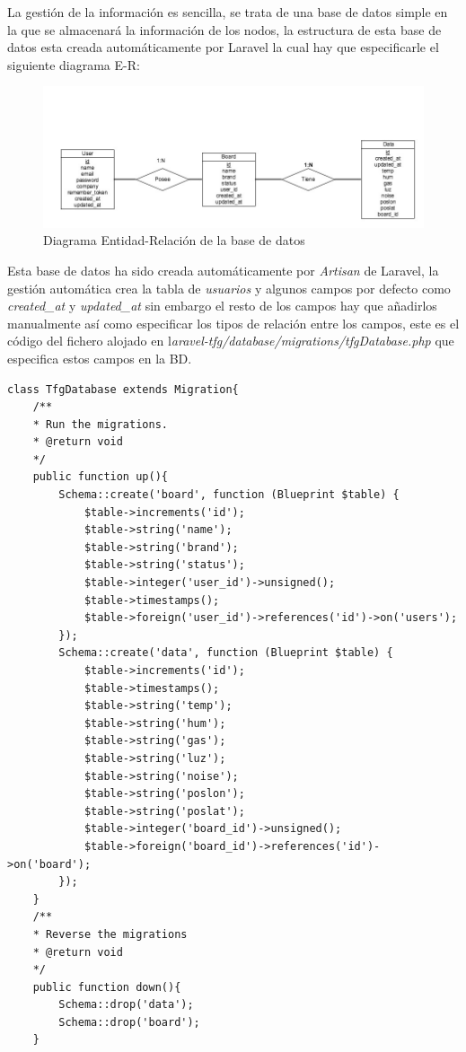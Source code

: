 La gestión de la información es sencilla, se trata de una base de datos simple en la que se almacenará la información de los nodos, la estructura de esta base de datos esta creada automáticamente por Laravel la cual hay que especificarle el siguiente diagrama E-R:
\setlength{\parindent}{0ex}
\begin{figure}[!h]
	\centering
	\includegraphics[width=0.9\linewidth]{figuras/diagramaer}
	\caption{Diagrama Entidad-Relación de la base de datos}
	\label{fig:bd1}
\end{figure}

Esta base de datos ha sido creada automáticamente por \textit{Artisan} de Laravel, la gestión automática crea la tabla de \textit{usuarios} y algunos campos por defecto como \textit{created\_at} y \textit{updated\_at} sin embargo el resto de los campos hay que añadirlos manualmente así como especificar los tipos de relación entre los campos, este es el código del fichero alojado en l\textit{aravel-tfg/database/migrations/tfgDatabase.php} que especifica estos campos en la BD.\\

\begin{lstlisting}[caption=Migracion de la base de datos, label=migration]
class TfgDatabase extends Migration{
	/**
	* Run the migrations.
	* @return void
	*/
	public function up(){
		Schema::create('board', function (Blueprint $table) {
			$table->increments('id');
			$table->string('name');
			$table->string('brand');
			$table->string('status');
			$table->integer('user_id')->unsigned();
			$table->timestamps();
			$table->foreign('user_id')->references('id')->on('users');
		});
		Schema::create('data', function (Blueprint $table) {
			$table->increments('id');
			$table->timestamps();
			$table->string('temp');
			$table->string('hum');
			$table->string('gas');
			$table->string('luz');
			$table->string('noise');
			$table->string('poslon');
			$table->string('poslat');
			$table->integer('board_id')->unsigned();
			$table->foreign('board_id')->references('id')->on('board');
		});
	}
	/**
	* Reverse the migrations
	* @return void
	*/
	public function down(){
		Schema::drop('data');
		Schema::drop('board');
	}
\end{lstlisting}

